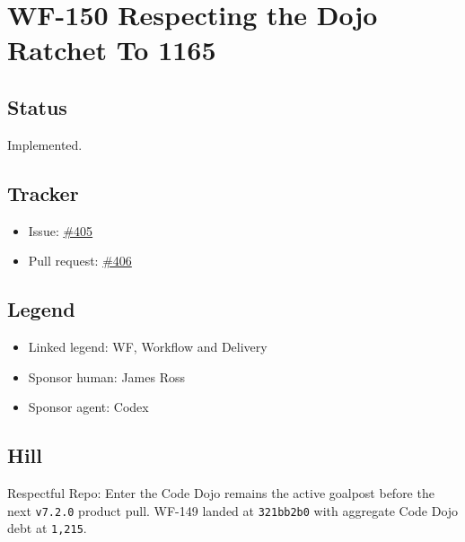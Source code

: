 \chapter{WF-150 Respecting the Dojo Ratchet To 1165}\label{record-232}

\smallskip

\section{Status}\label{record-232-status}

Implemented.

\section{Tracker}\label{record-232-tracker}

\begin{itemize}
\tightlist
\item
  Issue: \href{https://github.com/flyingrobots/bijou/issues/405}{\#405}
\item
  Pull request: \href{https://github.com/flyingrobots/bijou/pull/406}{\#406}
\end{itemize}

\section{Legend}\label{record-232-legend}

\begin{itemize}
\tightlist
\item
  Linked legend: WF, Workflow and Delivery
\item
  Sponsor human: James Ross
\item
  Sponsor agent: Codex
\end{itemize}

\section{Hill}\label{record-232-hill}

Respectful Repo: Enter the Code Dojo remains the active goalpost before the next \texttt{v\allowbreak{}7\allowbreak{}.\allowbreak{}2\allowbreak{}.\allowbreak{}0} product pull. WF-149 landed at \texttt{3\allowbreak{}2\allowbreak{}1\allowbreak{}b\allowbreak{}b\allowbreak{}2\allowbreak{}b\allowbreak{}0} with aggregate Code Dojo debt at \texttt{1\allowbreak{},\allowbreak{}2\allowbreak{}1\allowbreak{}5}.

